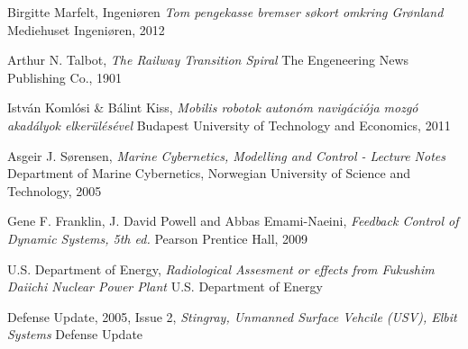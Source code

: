 \documentclass{ifacconf}
\begin{document}
\begin{thebibliography}{xx}

Birgitte Marfelt,
\newblock Ingeni\o ren
\newblock \emph{Tom pengekasse bremser søkort omkring Gr\o nland}
\newblock Mediehuset Ingeniøren, 2012

Arthur N. Talbot,
\newblock \emph{The Railway Transition Spiral}
\newblock The Engeneering News Publishing Co., 1901

Istv\'an Koml\'{o}si \& B\'alint Kiss, %
\newblock \emph{Mobilis robotok auton\'{o}m navig\'aci\'{o}ja mozg\'{o} akad\'alyok elker\"ul\'es\'evel} %
\newblock Budapest University of Technology and Economics, 2011 %

Asgeir J. S\o rensen,
\newblock \emph{Marine Cybernetics, Modelling and Control - Lecture Notes}
\newblock Department of Marine Cybernetics, Norwegian University of Science and Technology, 2005

Gene F. Franklin, J. David Powell and Abbas Emami-Naeini,
\newblock \emph{Feedback Control of Dynamic Systems, 5th ed.}
\newblock Pearson Prentice Hall, 2009

U.S. Department of Energy,
\newblock \emph{Radiological Assesment or effects from Fukushim Daiichi Nuclear Power Plant}
\newblock U.S. Department of Energy

Defense Update, 2005, Issue 2,
\newblock \emph{Stingray, Unmanned Surface Vehcile (USV), Elbit Systems}
\newblock Defense Update

\end{thebibliography}
\end{document}
